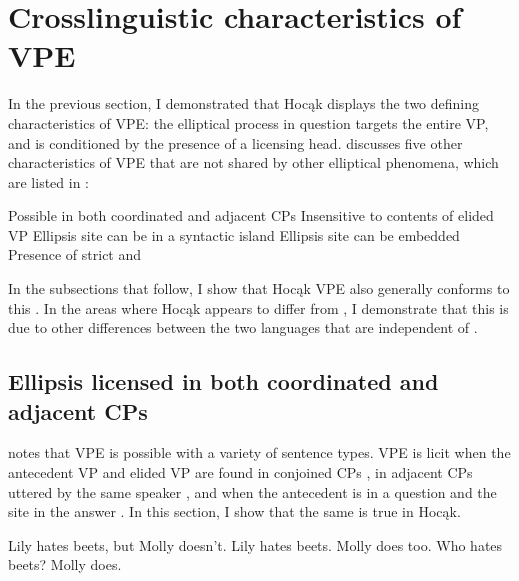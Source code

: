 \documentclass[output=paper]{LSP/langsci}
\begin{document}
\section{Crosslinguistic characteristics of VPE}\label{sec:johnson:3}

 
In the previous section, I demonstrated that Hocąk displays the two defining characteristics of VPE: the elliptical process in question targets the entire VP, and is conditioned by the presence of a licensing head. \citet{Goldberg2005} discusses five other characteristics of VPE that are not shared by other elliptical phenomena, which are listed in : 
 
 
\ea\label{ex:johnson:24}
\ea 
Possible in both coordinated and adjacent CPs
\ex 
Insensitive to contents of elided VP
\ex 
Ellipsis site can be in a syntactic island
\ex 
Ellipsis site can be embedded
\ex 
Presence of strict and 
\z
\z


 
In the subsections that follow, I show that Hocąk VPE also generally conforms to this . In the areas where Hocąk appears to differ from , I demonstrate that this is due to other differences between the two languages that are independent of .
 

\subsection{Ellipsis licensed in both coordinated and adjacent CPs}\label{sec:johnson:3.1}

 
\citet{Goldberg2005} notes that  VPE is possible with a variety of sentence types. VPE is licit when the antecedent VP and elided VP are found in conjoined CPs , in adjacent CPs uttered by the same speaker , and when the antecedent is in a question and the  site in the answer . In this section, I show that the same is true in Hocąk.
 
 
\ea\label{ex:johnson:25}
\ea\label{ex:johnson:25a}
Lily hates beets, but Molly doesn't.
\ex\label{ex:johnson:25b}
Lily hates beets. Molly does too.
\ex\label{ex:johnson:25c} 
Who hates beets? Molly does.
\z
\z
\end{document}
